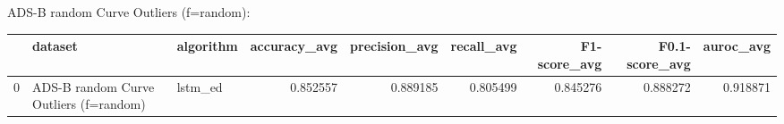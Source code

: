 ADS-B random Curve Outliers (f=random):

\begin{tabular}{rllrrrrrr}
\hline
    & dataset                                & algorithm   &   accuracy\_avg &   precision\_avg &   recall\_avg &   F1-score\_avg &   F0.1-score\_avg &   auroc\_avg \\
\hline
  0 & ADS-B random Curve Outliers (f=random) & lstm\_ed     &       0.852557 &        0.889185 &     0.805499 &       0.845276 &         0.888272 &    0.918871 \\
\hline
\end{tabular}

